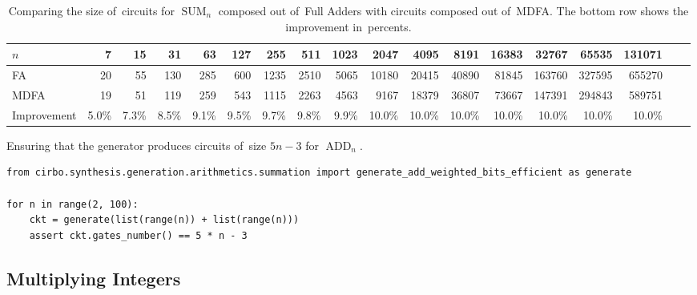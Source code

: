 \documentclass[sigconf, review, anonymous]{acmart}
\DeclareMathOperator{\SUM}{SUM}
\DeclareMathOperator{\ADD}{ADD}
\begin{document}
\begin{table}
	\begin{center}
		\begin{tabular}{lrrrrrrrrrrrrrrrrr}
			\toprule
			$n$ & 7 & 15 & 31 & 63 & 127 & 255 & 511 & 1023 & 2047 & 4095 & 8191 & 16383 & 32767 & 65535 & 131071 \\
			\midrule
			FA & 20 & 55 & 130 & 285 & 600 & 1235 & 2510 & 5065 & 10180 & 20415 & 40890 & 81845 & 163760 & 327595 & 655270 \\
			MDFA & 19 & 51 & 119 & 259 & 543 & 1115 & 2263 & 4563 & 9167 & 18379 & 36807 & 73667 & 147391 & 294843 & 589751 \\
			Improvement  & 5.0\%  & 7.3\%  & 8.5\%  & 9.1\%  & 9.5\%  & 9.7\%  & 9.8\%  & 9.9\%  & 10.0\%  & 10.0\%  & 10.0\%  & 10.0\%  & 10.0\%  & 10.0\%  & 10.0\% \\ 
			\bottomrule
		\end{tabular}
	\end{center}
	\caption{Comparing the size of~circuits for $\SUM_n$ composed out of~Full Adders with
	circuits composed out of~MDFA. The bottom row shows the improvement in~percents.}
	\label{table:first}
\end{table}

\begin{listing}
	\caption{Ensuring that the generator produces circuits of~size $5n-3$ for $\ADD_n$.}
	\label{listing:add}
	\begin{lstlisting}
from cirbo.synthesis.generation.arithmetics.summation import generate_add_weighted_bits_efficient as generate

for n in range(2, 100):
    ckt = generate(list(range(n)) + list(range(n)))
    assert ckt.gates_number() == 5 * n - 3
	\end{lstlisting}
\end{listing}

\subsection{Multiplying Integers}
\end{document}
